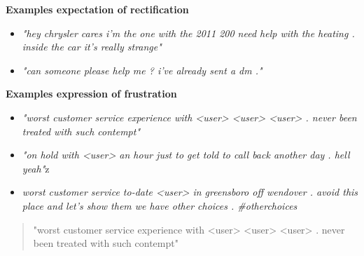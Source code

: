 \textbf{Examples expectation of rectification}
\begin{itemize}
    \item[\textbullet]\textit{"hey chrysler cares i'm the one with the 2011 200 need help with the heating . inside the car it's really strange"}
    \item[\textbullet]\textit{"can someone please help me ? i've already sent a dm ."}
\end{itemize}
\textbf{Examples expression of frustration}
\begin{itemize}
    \item[\textbullet]\textit{"worst customer service experience with <user> <user> <user> . never been treated with such contempt"}
    \item[\textbullet]\textit{"on hold with <user> an hour just to get told to call back another day . hell yeah"}z
    \item[\textbullet]\textit{worst customer service to-date <user> in greensboro off wendover . avoid this place and let's show them we have other choices . \#otherchoices}
\end{itemize}

\begin{quote}
    "worst customer service experience with <user> <user> <user> . never been treated with such contempt"
\end{quote}

